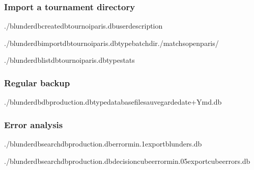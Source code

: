 \documentclass[letterpaper,10pt,english]{sphinxmanual}
\begin{document}
\subsubsection{Import a tournament directory}
\label{\detokenize{cli:import-d-un-repertoire-de-tournoi}}
\begin{sphinxVerbatim}[commandchars=\\\{\}]
./blunderdbcreate\PYGZhy{}\PYGZhy{}dbtournoi\PYGZus{}paris.db\PYGZhy{}\PYGZhy{}user\PYGZhy{}\PYGZhy{}description

./blunderdbimport\PYGZhy{}\PYGZhy{}dbtournoi\PYGZus{}paris.db\PYGZhy{}\PYGZhy{}typebatch\PYGZhy{}\PYGZhy{}dir./matchs\PYGZus{}open\PYGZus{}paris/

./blunderdblist\PYGZhy{}\PYGZhy{}dbtournoi\PYGZus{}paris.db\PYGZhy{}\PYGZhy{}typestats
\end{sphinxVerbatim}


\subsubsection{Regular backup}
\label{\detokenize{cli:sauvegarde-reguliere}}
\begin{sphinxVerbatim}[commandchars=\\\{\}]
./blunderdb\PYGZhy{}\PYGZhy{}dbproduction.db\PYGZhy{}\PYGZhy{}typedatabase\PYGZhy{}\PYGZhy{}filesauvegarde\PYGZhy{}date+\PYGZpc{}Y\PYGZpc{}m\PYGZpc{}d.db
\end{sphinxVerbatim}


\subsubsection{Error analysis}
\label{\detokenize{cli:analyse-des-erreurs}}
\begin{sphinxVerbatim}[commandchars=\\\{\}]
./blunderdbsearch\PYGZhy{}\PYGZhy{}dbproduction.db\PYGZhy{}\PYGZhy{}error\PYGZhy{}min.1\PYGZhy{}\PYGZhy{}exportblunders.db

./blunderdbsearch\PYGZhy{}\PYGZhy{}dbproduction.db\PYGZhy{}\PYGZhy{}decisioncube\PYGZhy{}\PYGZhy{}error\PYGZhy{}min.05\PYGZhy{}\PYGZhy{}exportcube\PYGZus{}errors.db
\end{sphinxVerbatim}
\end{document}
